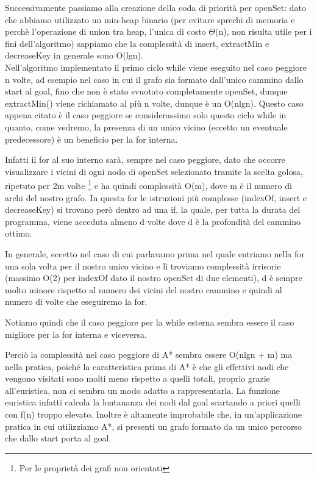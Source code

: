 \documentclass[12pt,a4paper]{report}
\begin{document}
Successivamente passiamo alla creazione della coda di priorità per openSet: dato che abbiamo utilizzato un min-heap binario (per evitare sprechi di memoria e perchè l'operazione di union tra heap, l'unica di costo \(\Theta\)(n), non risulta utile per i fini dell'algoritmo) sappiamo che la complessità di insert, extractMin e decreaseKey in generale sono O(lgn).
\\

Nell'algoritmo implementato il primo ciclo while viene eseguito nel caso peggiore n volte, ad esempio nel caso in cui il grafo sia formato dall'unico cammino dallo start al goal, fino che non è stato svuotato completamente openSet, dunque extractMin() viene richiamato al più n volte, dunque è un O(nlgn).
Questo caso appena citato è il caso peggiore se considerassimo solo questo ciclo while in quanto, come vedremo, la presenza di un unico vicino (eccetto un eventuale predecessore) è un beneficio per la for interna.

Infatti il for al suo interno sarà, sempre nel caso peggiore, dato che occorre visualizzare i vicini di ogni nodo di openSet selezionato tramite la scelta golosa, ripetuto per 2m volte \footnote[2]{Per le proprietà dei grafi non orientati} e ha quindi complessità O(m), dove m è il numero di archi del nostro grafo.
In questa for le istruzioni più complesse (indexOf, insert e decreaseKey) si trovano però dentro ad una if, la quale, per tutta la durata del programma, viene acceduta almeno d volte dove d è la profondità del cammino ottimo.


In generale, eccetto nel caso di cui parlavamo prima nel quale entriamo nella for una sola volta per il nostro unico vicino e lì troviamo complessità irrisorie (massimo O(2) per indexOf dato il nostro openSet di due elementi), d è sempre molto minore rispetto al numero dei vicini del nostro cammino e quindi al numero di volte che eseguiremo la for.

Notiamo quindi che il caso peggiore per la while esterna sembra essere il caso migliore per la for interna e viceversa.


Perciò la complessità nel caso peggiore di A* sembra essere O(nlgn + m) ma nella pratica, poiché la caratteristica prima di A* è che gli effettivi nodi che vengono visitati sono molti meno rispetto a quelli totali, proprio grazie all'euristica, non ci sembra un modo adatto a rappresentarla.
La funzione euristica infatti calcola la lontananza dei nodi dal goal scartando a priori quelli con f(n) troppo elevato.
Inoltre è altamente improbabile che, in un'applicazione pratica in cui utilizziamo A*, si presenti un grafo formato da un unico percorso che dallo start porta al goal.
\end{document}
